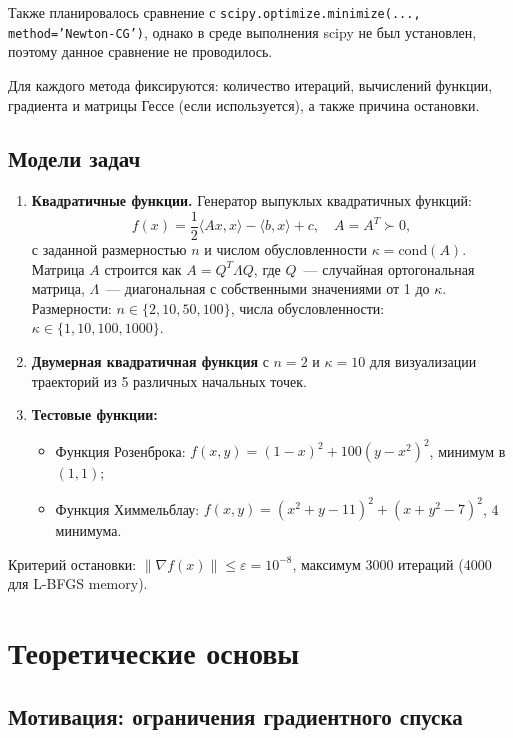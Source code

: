 \documentclass[12pt]{article}
\begin{document}
Также планировалось сравнение с \texttt{scipy.optimize.minimize(..., method='Newton-CG')}, однако в среде выполнения scipy не был установлен, поэтому данное сравнение не проводилось.

Для каждого метода фиксируются: количество итераций, вычислений функции, градиента и матрицы Гессе (если используется), а также причина остановки.

\subsection*{Модели задач}

\begin{enumerate}
    \item \textbf{Квадратичные функции.} Генератор выпуклых квадратичных функций:
    \[
        f(x) = \frac{1}{2}\langle Ax, x \rangle - \langle b, x \rangle + c, \quad A = A^T \succ 0,
    \]
    с заданной размерностью $n$ и числом обусловленности $\kappa = \text{cond}(A)$. Матрица $A$ строится как $A = Q^T \Lambda Q$, где $Q$~--- случайная ортогональная матрица, $\Lambda$~--- диагональная с собственными значениями от 1 до $\kappa$. Размерности: $n \in \{2, 10, 50, 100\}$, числа обусловленности: $\kappa \in \{1, 10, 100, 1000\}$.

    \item \textbf{Двумерная квадратичная функция} с $n = 2$ и $\kappa = 10$ для визуализации траекторий из 5 различных начальных точек.

    \item \textbf{Тестовые функции:}
    \begin{itemize}
        \item Функция Розенброка: $f(x,y) = (1-x)^2 + 100(y-x^2)^2$, минимум в $(1, 1)$;
        \item Функция Химмельблау: $f(x,y) = (x^2+y-11)^2 + (x+y^2-7)^2$, 4 минимума.
    \end{itemize}
\end{enumerate}

Критерий остановки: $\|\nabla f(x)\| \leq \varepsilon = 10^{-8}$, максимум 3000 итераций (4000 для L-BFGS memory).

\section{Теоретические основы}

\subsection{Мотивация: ограничения градиентного спуска}
\end{document}
